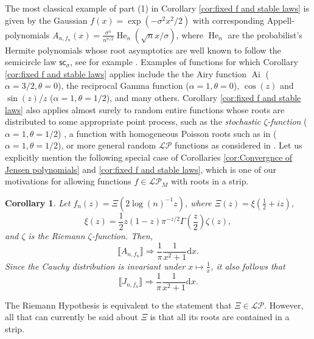 \documentclass[reqno]{amsart}
\newcommand{\1}{\mathbf{1}}
\DeclareMathOperator{\He}{He}
\DeclareMathOperator{\Ai}{Ai}
\newcommand{\dd}{\mathrm{d}}
\newcommand{\R}{\mathbb{R}}
\def\R{\mathbb{R}}
\newcommand{\LP}{\mathcal{LP}}
\theoremstyle{plain}
\newtheorem{corollary}[theorem]{Corollary}
\theoremstyle{definition}
\theoremstyle{remark}
\numberwithin{equation}{section}
\begin{document}
The most classical example of part (1) in Corollary \ref{cor:fixed f and stable laws} is given by the Gaussian $f(x)=\exp(-\sigma^2x^2/2)$ with corresponding Appell-polynomials $A_{n,f_n}(x)=\frac{\sigma ^n}{n^{n/2}}\He_n(\sqrt n x/\sigma)$, where $\He_n$ are the probabilist's Hermite polynomials whose root asymptotics are well known to follow the semicircle law $\mathsf{sc_{\sigma}}$, see for example \cite{Jalowy-Kabluchko-Marynych2025part2}. Examples of functions for which Corollary \ref{cor:fixed f and stable laws} applies include the the Airy function $\Ai$ ($\alpha=3/2, \theta=0$), the reciprocal Gamma function ($\alpha=1, \theta=0$), $\cos(z)$ and $\sin(z)/z$ ($\alpha=1, \theta=1/2$), and many others. Corollary \ref{cor:fixed f and stable laws} also applies almost surely to random entire functions whose roots are distributed to some appropriate point process, such as the \emph{stochastic $\zeta$-function} ($\alpha=1, \theta=1/2$) \cite{Valko-Virag2022}, a function with homogeneous Poisson roots such as in \cite{Pemantle-Subramanian2017} ($\alpha=1, \theta=1/2$), or more general random $\LP$ functions as considered in \cite{Assiotis2022}. 
Let us explicitly mention the following special case of Corollaries \ref{cor:Convergnce of Jensen polynomials} and \ref{cor:fixed f and stable laws}, which is one of our motivations for allowing functions $f\in\LP_M$ with roots in a strip.  \begin{corollary}\label{cor:Riemann Xi}
	Let $f_{n}(z)=\Xi(2\log(n)^{-1} z)$, where $\Xi(z)=\xi\left(\frac{1}{2}+iz\right)$, \begin{equation}
		\xi(z)=\frac{1}{2}z(1-z)\pi^{-z/2}\Gamma\left(\frac{z}{2}\right)\zeta(z),
	\end{equation} and $\zeta$ is the Riemann $\zeta$-function. Then, \begin{equation}
		\llbracket A_{n,f_n}\rrbracket\Rightarrow\frac{1}{\pi}\frac{1}{x^2+1}\dd x.
	\end{equation} Since the Cauchy distribution is invariant under $x\mapsto\frac{1}{x}$, it also follows that \begin{equation}
		\llbracket J_{n,f_n}\rrbracket \Rightarrow \frac{1}{\pi}\frac{1}{x^2+1}\dd x.
	\end{equation} 
\end{corollary} The Riemann Hypothesis is equivalent to the statement that $\Xi\in\LP$. However, all that can currently be said about $\Xi$ is that all its roots are contained in a strip.  
\end{document}
